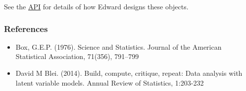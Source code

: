 See the \href{api/index.html}{API} for details of how Edward designs these objects.

\subsubsection{References}\label{references}

\begin{itemize}
\item
  Box, G.E.P. (1976). Science and Statistics. Journal of the American
  Statistical Association, 71(356), 791–799
\item
  David M Blei. (2014). Build, compute, critique, repeat: Data analysis with
  latent variable models. Annual Review of Statistics, 1:203-232
\end{itemize}
